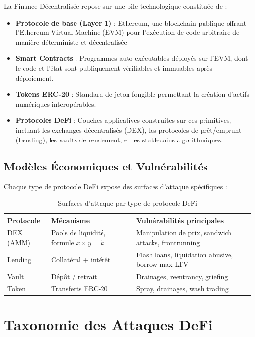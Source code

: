 \documentclass[12pt,a4paper]{report}
\begin{document}
La Finance Décentralisée repose sur une pile technologique constituée de :

\begin{itemize}
  \item \textbf{Protocole de base (Layer 1)} : Ethereum, une blockchain publique offrant l'Ethereum Virtual Machine (EVM) pour l'exécution de code arbitraire de manière déterministe et décentralisée.
  \item \textbf{Smart Contracts} : Programmes auto-exécutables déployés sur l'EVM, dont le code et l'état sont publiquement vérifiables et immuables après déploiement.
  \item \textbf{Tokens ERC-20} : Standard de jeton fongible permettant la création d'actifs numériques interopérables.
  \item \textbf{Protocoles DeFi} : Couches applicatives construites sur ces primitives, incluant les exchanges décentralisés (DEX), les protocoles de prêt/emprunt (Lending), les vaults de rendement, et les stablecoins algorithmiques.
\end{itemize}

\subsection{Modèles Économiques et Vulnérabilités}

Chaque type de protocole DeFi expose des surfaces d'attaque spécifiques :

\begin{table}[H]
\centering
\caption{Surfaces d'attaque par type de protocole DeFi}
\label{tab:attack_surfaces}
\begin{tabularx}{\linewidth}{L{3cm} L{4cm} L{6cm}}
\toprule
\textbf{Protocole} & \textbf{Mécanisme} & \textbf{Vulnérabilités principales} \\
\midrule
DEX (AMM) & Pools de liquidité, formule $x \times y = k$ & Manipulation de prix, sandwich attacks, frontrunning \\
Lending & Collatéral + intérêt & Flash loans, liquidation abusive, borrow max LTV \\
Vault & Dépôt / retrait & Drainages, reentrancy, griefing \\
Token & Transferts ERC-20 & Spray, drainages, wash trading \\
\bottomrule
\end{tabularx}
\end{table}

\section{Taxonomie des Attaques DeFi}
\end{document}
